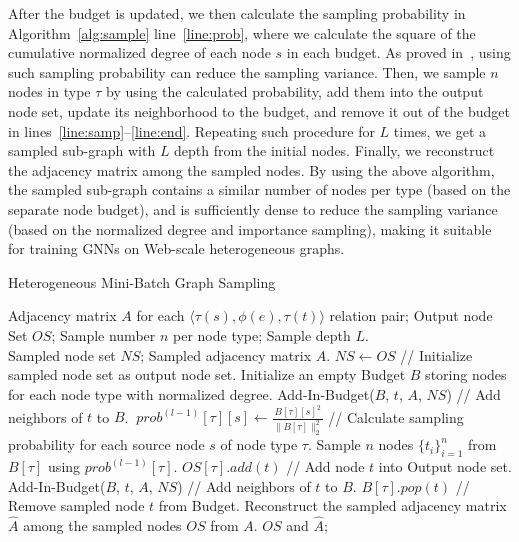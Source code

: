 \documentclass[sigconf]{acmart}
\theoremstyle{definition}
\begin{document}
After the budget is updated, we then calculate the sampling probability in Algorithm~\ref{alg:sample} line~\ref{line:prob}, where we calculate the square of the cumulative normalized degree of each node $s$ in each budget. 
As proved in~\cite{ladies}, using such sampling probability can reduce the sampling variance. Then, we sample $n$ nodes in  type $\tau$ by using the calculated probability, add them into the output node set, update its neighborhood to the budget, and remove it out of the budget in lines~\ref{line:samp}--\ref{line:end}. 
Repeating such procedure for $L$ times, we get a sampled sub-graph with $L$ depth from the initial nodes. Finally, we reconstruct the adjacency matrix among the sampled nodes. 
By using the above algorithm, the sampled sub-graph contains a similar number of nodes per  type (based on the separate node budget), and is sufficiently dense to reduce the sampling variance (based on the normalized degree and importance sampling), making it suitable for training GNNs on Web-scale heterogeneous graphs.


\begin{algorithm}[tb] 
\caption{Heterogeneous Mini-Batch Graph Sampling} 
\label{alg:sample} 
\begin{algorithmic}[1] 
\REQUIRE
Adjacency matrix $A$ for each $\langle \tau(s), \phi(e), \tau(t) \rangle$ relation pair; Output node Set $OS$; Sample number $n$ per node type; Sample depth $L$.\\
\ENSURE
Sampled node set $NS$; Sampled adjacency matrix $\hat{A}$.
\STATE  $NS \gets OS$ // Initialize sampled node set as output node set.
\STATE  Initialize an empty Budget $B$ storing nodes for each node type with normalized degree. 
    \STATE  Add-In-Budget($B$, $t$, $A$, $NS$) // Add neighbors of $t$ to $B$.
\ENDFOR
{}
            \STATE  $\ prob^{(l-1)}[\tau][s] \gets \frac{B[\tau][s]^2}{\|B[\tau]\|_2^2}$ // Calculate sampling probability for each source node $s$ of node type $\tau$. \label{line:prob}
        \ENDFOR
        \STATE  Sample $n$ nodes ${\{t_i\}}_{i=1}^n$ from $B[\tau]$ using $prob^{(l-1)}[\tau]$.
         \label{line:samp}
            \STATE  $OS[\tau].add(t)$ // Add node $t$ into Output node set.
            \STATE  Add-In-Budget($B$, $t$, $A$, $NS$) // Add neighbors of $t$ to $B$.
            \STATE  $B[\tau].pop(t)$ // Remove sampled node $t$ from Budget. \label{line:end}
        \ENDFOR
    \ENDFOR
\ENDFOR
\STATE  Reconstruct the sampled adjacency matrix $\hat{A}$ among the sampled nodes $OS$ from $A$.
\RETURN $OS$ and $\hat{A}$; 
\end{algorithmic} 
\end{algorithm}
\end{document}
